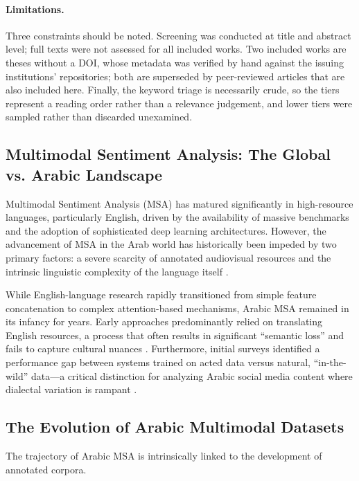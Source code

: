 \documentclass[12pt, a4paper]{article}
\begin{document}
\paragraph{Limitations.} Three constraints should be noted. Screening was conducted at title and abstract level; full texts were not assessed for all included works. Two included works are theses without a DOI, whose metadata was verified by hand against the issuing institutions' repositories; both are superseded by peer-reviewed articles that are also included here. Finally, the keyword triage is necessarily crude, so the tiers represent a reading order rather than a relevance judgement, and lower tiers were sampled rather than discarded unexamined.

\subsection{Multimodal Sentiment Analysis: The Global vs. Arabic Landscape}
Multimodal Sentiment Analysis (MSA) has matured significantly in high-resource languages, particularly English, driven by the availability of massive benchmarks and the adoption of sophisticated deep learning architectures. However, the advancement of MSA in the Arab world has historically been impeded by two primary factors: a severe scarcity of annotated audiovisual resources and the intrinsic linguistic complexity of the language itself \citep{Hussien2018}.

While English-language research rapidly transitioned from simple feature concatenation to complex attention-based mechanisms, Arabic MSA remained in its infancy for years. Early approaches predominantly relied on translating English resources, a process that often results in significant ``semantic loss'' and fails to capture cultural nuances \citep{Youcef2021}. Furthermore, initial surveys identified a performance gap between systems trained on acted data versus natural, ``in-the-wild'' data---a critical distinction for analyzing Arabic social media content where dialectal variation is rampant \citep{Hussien2018}.

\subsection{The Evolution of Arabic Multimodal Datasets}
The trajectory of Arabic MSA is intrinsically linked to the development of annotated corpora. 
\end{document}
